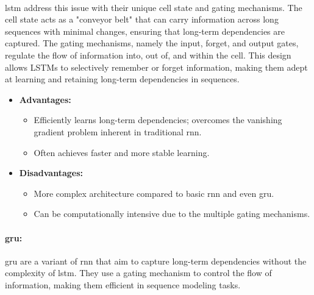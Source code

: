         \paragraph{}\acrshort{lstm} address this issue with their unique cell state and gating mechanisms. The cell state acts as a "conveyor belt" that can carry information across long sequences with minimal changes, ensuring that long-term dependencies are captured. The gating mechanisms, namely the input, forget, and output gates, regulate the flow of information into, out of, and within the cell. This design allows LSTMs to selectively remember or forget information, making them adept at learning and retaining long-term dependencies in sequences.

        \begin{itemize}
            \item \textbf{Advantages:}
            \begin{itemize}
                \item Efficiently learns long-term dependencies; overcomes the vanishing gradient problem inherent in traditional \acrshort{rnn}.
                \item Often achieves faster and more stable learning.
            \end{itemize}
            \item \textbf{Disadvantages:}
            \begin{itemize}
                \item More complex architecture compared to basic \acrshort{rnn} and even \acrshort{gru}.
                \item Can be computationally intensive due to the multiple gating mechanisms.
            \end{itemize}
        \end{itemize}

        \paragraph{\acrfull{gru}\cite{chung_empirical_2014}:} \acrshort{gru} are a variant of \acrshort{rnn} that aim to capture long-term dependencies without the complexity of \acrshort{lstm}. They use a gating mechanism to control the flow of information, making them efficient in sequence modeling tasks.


